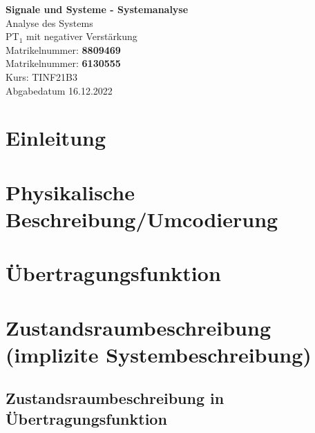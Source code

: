 \documentclass[
  ngerman
  ,12pt
  ,pdftex
]{article}
\begin{document}
\begin{titlepage}
  \begin{center}
      {\Huge \textbf{Signale und Systeme - Systemanalyse}}\\[1.5cm]
      {\Large Analyse des Systems}\\[1cm]
      {\Huge PT$_{1}$ mit negativer Verstärkung}\\[7cm]
      {\large Matrikelnummer: \textbf{8809469}}\\[0.5cm]
      {\large Matrikelnummer: \textbf{6130555}}\\[0.5cm]
      {\large Kurs: TINF21B3}\\[0.5cm]
      {\large Abgabedatum 16.12.2022}
      \vfill
  \end{center}
\end{titlepage}
\newpage
\tableofcontents
\newpage



\section{Einleitung}    %


% 

\section{Physikalische Beschreibung/Umcodierung}    %


\section{Übertragungsfunktion}    %


\section{Zustandsraumbeschreibung (implizite Systembeschreibung)}


\subsection{Zustandsraumbeschreibung in Übertragungsfunktion}  %

\end{document}
